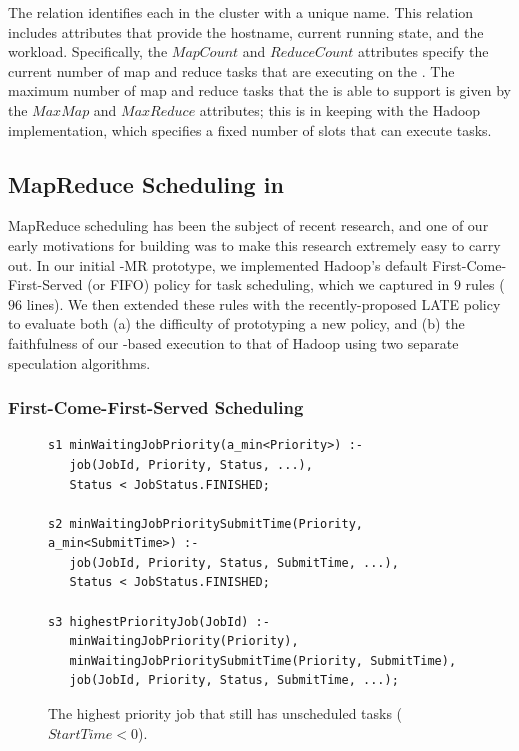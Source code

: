 The  relation identifies each {\TT} in the cluster with a
unique name.  This relation includes attributes that provide the hostname,
current running state, and the \TT workload.  Specifically, the $MapCount$ and
$ReduceCount$ attributes specify the current number of map and reduce tasks
that are executing on the \TT.  The maximum number of map and reduce tasks that
the \TT is able to support is given by the $MaxMap$ and $MaxReduce$ attributes;
this is in keeping with the Hadoop implementation, which specifies a fixed
number of slots that can execute tasks.


\subsection{MapReduce Scheduling in \OVERLOG}
\label{ch:boom:sec:scheduler}

MapReduce scheduling has been the subject of recent research, and one of our
early motivations for building \BOOMA was to make this research extremely easy
to carry out.  In our initial \BOOM-MR prototype, we implemented Hadoop's
default First-Come-First-Served (or FIFO) policy for task scheduling, which we
captured in $9$ rules ($96$ lines).  We then extended these rules with the
recently-proposed LATE policy~\cite{zaharia-late} to evaluate both (a) the
difficulty of prototyping a new policy, and (b) the faithfulness of our
\OVERLOG-based execution to that of Hadoop using two separate speculation
algorithms.

\subsubsection{First-Come-First-Served Scheduling}
\label{ch:boom:sec:fifo}

\begin{figure}
\label{fig:joborder}
\ssp
\centering
\begin{lstlisting}
s1 minWaitingJobPriority(a_min<Priority>) :-
   job(JobId, Priority, Status, ...),
   Status < JobStatus.FINISHED;
	
s2 minWaitingJobPrioritySubmitTime(Priority, a_min<SubmitTime>) :-
   job(JobId, Priority, Status, SubmitTime, ...),
   Status < JobStatus.FINISHED;

s3 highestPriorityJob(JobId) :-
   minWaitingJobPriority(Priority),
   minWaitingJobPrioritySubmitTime(Priority, SubmitTime),
   job(JobId, Priority, Status, SubmitTime, ...);
\end{lstlisting}
\caption{\label{ch:boom:fig:joborder}The highest priority job that still has unscheduled tasks ($StartTime < 0$).}
\end{figure}

